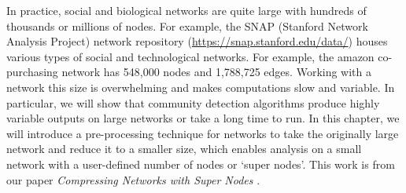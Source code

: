 \indent In practice, social and biological networks are quite large with hundreds of thousands or millions of nodes. For example, the SNAP (Stanford Network Analysis Project) network repository (\url{https://snap.stanford.edu/data/}) houses various types of social and technological networks. For example, the amazon co-purchasing network has 548,000 nodes and 1,788,725 edges. Working with a network this size is overwhelming and makes computations slow and variable. In particular, we will show that community detection algorithms produce highly variable outputs on large networks or take a long time to run. In this chapter, we will introduce a pre-processing technique for networks to take the originally large network and reduce it to a smaller size, which enables analysis on a small network with a user-defined number of nodes or `super nodes'. This work is from our paper \emph{Compressing Networks with Super Nodes} \cite{compressing}.

